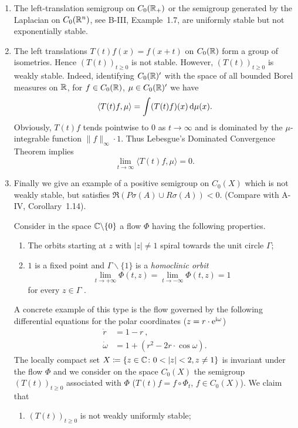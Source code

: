 \begin{example}\label{ex:b4-1.2}
%
\begin{enumerate}[\upshape (i), wide, labelindent=.5em]
\item
The left-translation semigroup on $C_{0}(\mathbb{R}_+)$ or the semigroup generated by the Laplacian on $C_{0}(\mathbb{R}^n)$, see B-III, Example~1.7, are uniformly stable but not exponentially stable.

\item 
The left translations $T(t)f(x) = f(x+t)$ on $C_{0}(\mathbb{R})$ form a group of isometries. 
Hence $(T(t))_{t \geq 0}$ is not stable. 
However, $(T(t))_{t \geq 0}$ is weakly stable. 
Indeed, identifying $C_{0}(\mathbb{R})'$ with the space of all bounded Borel measures on $\mathbb{R}$, for $f \in C_{0}(\mathbb{R})$, $\mu \in C_{0}(\mathbb{R})'$ we have
\[
   \langle T(t)f,\mu \rangle = \int (T(t)f)(x) \mathop{}\!\mathrm{d}{\mu}(x) .
\]
Obviously, $T(t)f$ tends pointwise to $0$ as $t \to \infty$ and is dominated by the $\mu$-integrable function $\|f\|_\infty \cdot 1$. 
Thus Lebesgue's Dominated Convergence Theorem implies
\[ 
\lim_{t\to\infty} \langle T(t)f,\mu \rangle = 0.
\]

\item 
Finally we give an example of a positive semigroup on $C_{0}(X)$ which is not weakly stable, but satisfies $\Re (P\sigma(A) \cup R\sigma(A)) < 0$. (Compare with A-IV, Corollary~1.14).

Consider in the space $\mathbb{C}\backslash\{0\}$ a flow $\Phi$ having the following properties.
\begin{enumerate}[--]
	\item 
	The orbits starting at $z$ with $|z| \neq 1$ spiral towards the unit circle $\Gamma$;
	
	\item 
	$1$ is a fixed point and $\Gamma\backslash\{1\}$ is a \emph{homoclinic orbit} \ie
    \[
    \lim_{t\to+\infty} \Phi(t,z) = \lim_{t\to-\infty} \Phi(t,z) = 1
    \]
    for every $z \in \Gamma$ .
\end{enumerate}

A concrete example of this type is the flow governed by the following differential equations for the polar coordinates (\ie $z = r\cdot \mathrm{e}^{\mathrm{i}\omega}$)
\begin{align*}
   \dot{r} &= 1 - r~,\\
   \dot{\omega} &= 1 + (r^2 - 2r\cdot\cos \omega) .
\end{align*}
The locally compact set $X \coloneq
 \{z \in \mathbb{C} \colon 0  <  |z|  <  2, z \neq 1\}$ is invariant under the flow $\Phi$ and we consider on the space $C_{0}(X)$ the semigroup $(T(t))_{t \geq 0}$ associated with $\Phi$ (\ie $T(t)f = f\circ\Phi_t$, $f \in C_{0}(X)$). 
 We claim that
\begin{enumerate}[\upshape (i)]
	\item
	$(T(t))_{t \geq 0}$ is not weakly uniformly stable;
	

\end{enumerate}
\end{enumerate}
\end{example}

